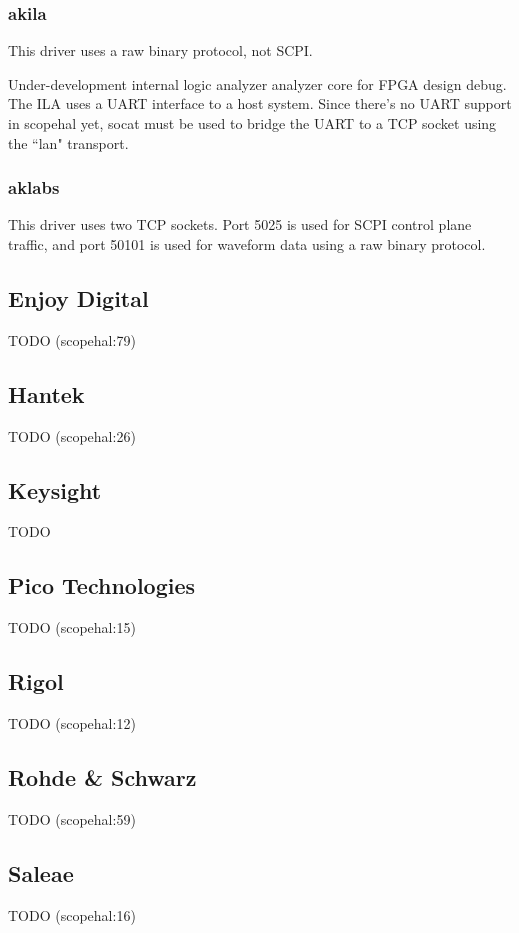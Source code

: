 \subsubsection{akila}

This driver uses a raw binary protocol, not SCPI.

Under-development internal logic analyzer analyzer core for FPGA design debug. The ILA uses a UART interface to a host
system. Since there's no UART support in scopehal yet, socat must be used to bridge the UART to a TCP socket using
the ``lan" transport.

\subsubsection{aklabs}

This driver uses two TCP sockets. Port 5025 is used for SCPI control plane traffic, and port 50101 is used for waveform
data using a raw binary protocol.

\subsection{Enjoy Digital}
TODO (scopehal:79)

\subsection{Hantek}
TODO (scopehal:26)

\subsection{Keysight}
TODO

\subsection{Pico Technologies}
TODO (scopehal:15)

\subsection{Rigol}
TODO (scopehal:12)

\subsection{Rohde \& Schwarz}
TODO (scopehal:59)

\subsection{Saleae}
TODO (scopehal:16)

